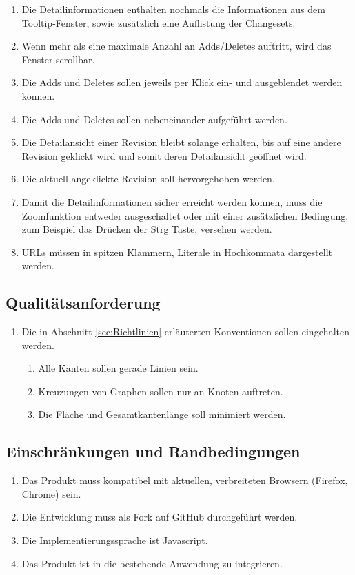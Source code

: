 \documentclass[nocolor]{tudbook}
\begin{document}
\begin{enumerate}[F1]
\begin{enumerate}[{F3}.1]
	\item Die Detailinformationen enthalten nochmals die Informationen aus dem Tooltip-Fenster, sowie zusätzlich eine Auflistung der Changesets.
	\item Wenn mehr als eine maximale Anzahl an Adds/Deletes auftritt, wird das Fenster scrollbar.
	\item Die Adds und Deletes sollen jeweils per Klick ein- und ausgeblendet werden können.
	\item Die Adds und Deletes sollen nebeneinander aufgeführt werden.
	\item Die Detailansicht einer Revision bleibt solange erhalten, bis auf eine andere Revision geklickt wird und somit deren Detailansicht geöffnet wird.
	\item Die aktuell angeklickte Revision soll hervorgehoben werden.
	\item Damit die Detailinformationen sicher erreicht werden können, muss die Zoomfunktion entweder ausgeschaltet oder mit einer zusätzlichen Bedingung, zum Beispiel das Drücken der \glqq Strg\grqq{} Taste, versehen werden. 
	\item URLs müssen in spitzen Klammern, Literale in Hochkommata dargestellt werden.
	\end{enumerate}
\end{enumerate}

\subsection{Qualitätsanforderung}
\begin{enumerate}[Q1]
	\item Die in Abschnitt \ref{sec:Richtlinien} erläuterten Konventionen sollen eingehalten werden.
	\begin{enumerate}[{Q1}.1]
		\item Alle Kanten sollen gerade Linien sein.
		\item Kreuzungen von Graphen sollen nur an Knoten auftreten.
		\item Die Fläche und Gesamtkantenlänge soll minimiert werden.
	\end{enumerate}
\end{enumerate}

\subsection{Einschränkungen und Randbedingungen}
\begin{enumerate}[R1]
	\item Das Produkt muss kompatibel mit aktuellen, verbreiteten Browsern (Firefox, Chrome) sein.
	\item Die Entwicklung muss als Fork auf GitHub durchgeführt werden.
	\item Die Implementierungssprache ist Javascript.
	\item Das Produkt ist in die bestehende Anwendung zu integrieren.
\end{enumerate}
\end{document}
